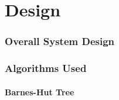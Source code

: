 \part{Design}

\section{Overall System Design}

\section{Algorithms Used}

\subsection{Barnes-Hut Tree}
